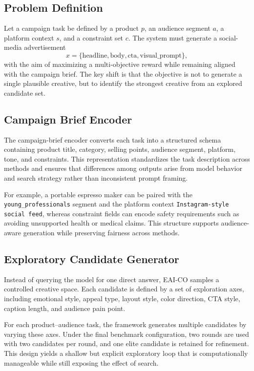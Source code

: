 \documentclass[applsci,article,submit,pdftex,moreauthors]{Definitions/mdpi}
\begin{document}
\subsection{Problem Definition}

Let a campaign task be defined by a product $p$, an audience segment $a$, a platform context $s$, and a constraint set $c$. The system must generate a social-media advertisement
\begin{equation}
x = \{\text{headline}, \text{body}, \text{cta}, \text{visual\_prompt}\},
\end{equation}
with the aim of maximizing a multi-objective reward while remaining aligned with the campaign brief. The key shift is that the objective is not to generate a single plausible creative, but to identify the strongest creative from an explored candidate set.

\subsection{Campaign Brief Encoder}

The campaign-brief encoder converts each task into a structured schema containing product title, category, selling points, audience segment, platform, tone, and constraints. This representation standardizes the task description across methods and ensures that differences among outputs arise from model behavior and search strategy rather than inconsistent prompt framing.

For example, a portable espresso maker can be paired with the \texttt{young\_professionals} segment and the platform context \texttt{Instagram-style social feed}, whereas constraint fields can encode safety requirements such as avoiding unsupported health or medical claims. This structure supports audience-aware generation while preserving fairness across methods.

\subsection{Exploratory Candidate Generator}

Instead of querying the model for one direct answer, EAI-CO samples a controlled creative space. Each candidate is defined by a set of exploration axes, including emotional style, appeal type, layout style, color direction, CTA style, caption length, and audience pain point.

For each product--audience task, the framework generates multiple candidates by varying these axes. Under the final benchmark configuration, two rounds are used with two candidates per round, and one elite candidate is retained for refinement. This design yields a shallow but explicit exploratory loop that is computationally manageable while still exposing the effect of search.
\end{document}
